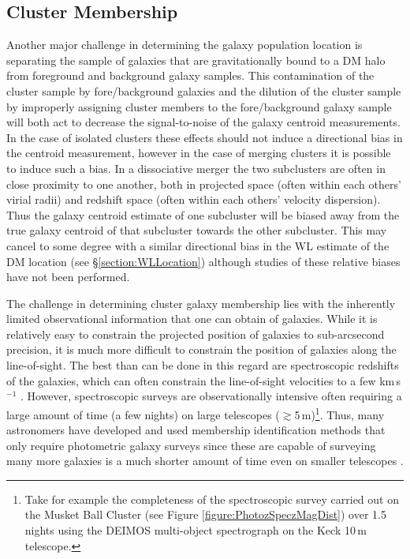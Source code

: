 \subsection{Cluster Membership}\label{section:ClusterMembership}

Another major challenge in determining the galaxy population location is separating the sample of galaxies that are gravitationally bound to a DM halo from foreground and background galaxy samples.
This contamination of the cluster sample by fore/background galaxies and the dilution of the cluster sample by improperly assigning cluster members to the fore/background galaxy sample will both act to decrease the signal-to-noise of the galaxy centroid measurements.
In the case of isolated clusters these effects should not induce a directional bias in the centroid measurement, however in the case of merging clusters it is possible to induce such a bias.
In a dissociative merger the two subclusters are often in close proximity to one another, both in projected space (often within each others' virial radii) and redshift space (often within each others' velocity dispersion).
Thus the galaxy centroid estimate of one subcluster will be biased away from the true galaxy centroid of that subcluster towards the other subcluster.
This may cancel to some degree with a similar directional bias in the WL estimate of the DM location (see \S\ref{section:WLLocation}) although studies of these relative biases have not been performed.  

The challenge in determining cluster galaxy membership lies with the inherently limited observational information that one can obtain of galaxies.
While it is relatively easy to constrain the projected position of galaxies to sub-arcsecond precision, it is much more difficult to constrain the position of galaxies along the line-of-sight.
The best than can be done in this regard are spectroscopic redshifts of the galaxies, which can often constrain the line-of-sight velocities to a few km\,s$^{-1}$ \citep[in the case of a 1200 line mm$^{-1}$ grating with resulting resolution of $\sim 1\,\AA$; see e.g.][]{Dawson:2012ub}.
However, spectroscopic surveys are observationally intensive often requiring a large amount of time (a few nights) on large telescopes ($\gtrsim$5\,m)\footnote{Take for example the completeness of the spectroscopic survey carried out on the Musket Ball Cluster (see Figure \ref{figure:PhotozSpeczMagDist}) over 1.5 nights using the DEIMOS multi-object spectrograph on the Keck 10\,m telescope.}.
Thus, many astronomers have developed and used membership identification methods that only require photometric galaxy surveys since these are capable of surveying many more galaxies is a much shorter amount of time even on smaller telescopes \citep[e.g. the DLS,][]{Wittman:2002cp}. 

